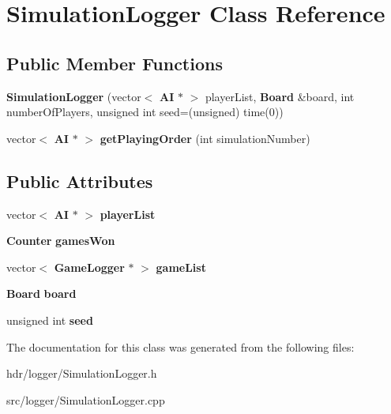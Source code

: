 \section{Simulation\-Logger Class Reference}
\label{class_simulation_logger}
\subsection*{Public Member Functions}
\begin{DoxyCompactItemize}
\item 
{\bfseries Simulation\-Logger} (vector$<$ {\bf A\-I} $\ast$ $>$ player\-List, {\bf Board} \&board, int number\-Of\-Players, unsigned int seed=(unsigned) time(0))\label{class_simulation_logger_a52dad1acd4474959f97b61d7d6c5f7aa}

\item 
vector$<$ {\bf A\-I} $\ast$ $>$ {\bfseries get\-Playing\-Order} (int simulation\-Number)\label{class_simulation_logger_adaca37b7ece3ffee3d7750806ff9a02d}

\end{DoxyCompactItemize}
\subsection*{Public Attributes}
\begin{DoxyCompactItemize}
\item 
vector$<$ {\bf A\-I} $\ast$ $>$ {\bfseries player\-List}\label{class_simulation_logger_a8c7f870f1f2a77c9be4ec64b1e514d8e}

\item 
{\bf Counter} {\bfseries games\-Won}\label{class_simulation_logger_ab3ee79eb79f0c07d42ebebebf057587b}

\item 
vector$<$ {\bf Game\-Logger} $\ast$ $>$ {\bfseries game\-List}\label{class_simulation_logger_a888c6db0861aa00e12f0a2674b4cd802}

\item 
{\bf Board} {\bfseries board}\label{class_simulation_logger_a224021a57c2a155d5bec0548d6368fe1}

\item 
unsigned int {\bfseries seed}\label{class_simulation_logger_a9af9361d2d81c2e0fd47a5fb26285761}

\end{DoxyCompactItemize}


The documentation for this class was generated from the following files\-:\begin{DoxyCompactItemize}
\item 
hdr/logger/Simulation\-Logger.\-h\item 
src/logger/Simulation\-Logger.\-cpp\end{DoxyCompactItemize}
